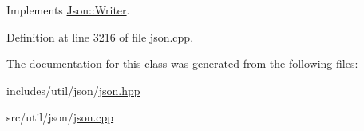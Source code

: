 Implements \hyperlink{class_json_1_1_writer_a7b2273a4ffd6f32b369ac8a53b7b5a0d}{Json\-::\-Writer}.



Definition at line 3216 of file json.\-cpp.



The documentation for this class was generated from the following files\-:\begin{DoxyCompactItemize}
\item 
includes/util/json/\hyperlink{json_8hpp}{json.\-hpp}\item 
src/util/json/\hyperlink{json_8cpp}{json.\-cpp}\end{DoxyCompactItemize}
